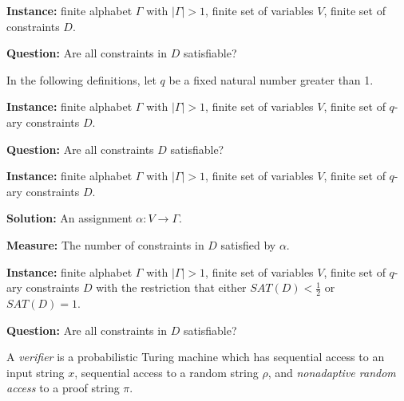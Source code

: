 \documentclass[]{article}
\begin{document}
\begin{definition}
  \mbox{}

  \textbf{Instance:} finite alphabet $\Gamma$ with $|\Gamma| > 1$, finite set of variables $V$, finite set of constraints $D$.

  \textbf{Question:} Are all constraints in $D$ satisfiable?
\end{definition}

In the following definitions, let $q$ be a fixed natural number greater than 1.

\begin{definition}
  \mbox{}

  \textbf{Instance:} finite alphabet $\Gamma$ with $|\Gamma| > 1$, finite set of variables $V$, finite set of $q$-ary constraints $D$.

  \textbf{Question:} Are all constraints $D$ satisfiable?
\end{definition}

\begin{definition}
  \mbox{}

  \textbf{Instance:} finite alphabet $\Gamma$ with $|\Gamma| > 1$, finite set of variables $V$, finite set of $q$-ary constraints $D$.

  \textbf{Solution:} An assignment $\alpha \colon V \to \Gamma$.

  \textbf{Measure:} The number of constraints in $D$ satisfied by $\alpha$.
\end{definition}

\begin{definition}
  \mbox{}

  \textbf{Instance:} finite alphabet $\Gamma$ with $|\Gamma| > 1$, finite set of variables $V$, finite set of $q$-ary constraints $D$ with the restriction that either $SAT(D) < \frac{1}{2}$ or $SAT(D) = 1$.

  \textbf{Question:} Are all constraints in $D$ satisfiable?
\end{definition}

\begin{definition}
  A \emph{\PCP{} verifier} is a probabilistic Turing machine which has sequential access to an input string $x$, sequential access to a random string $\rho$, and \emph{nonadaptive random access} to a proof string $\pi$.
\end{definition}
\end{document}
